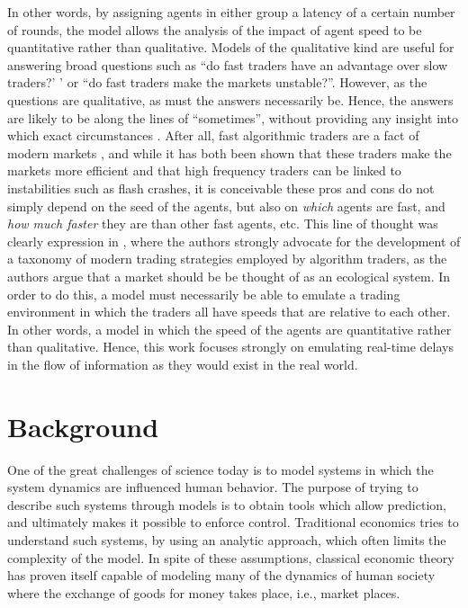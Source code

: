 \documentclass{article}
\begin{document}
%

In other words, by assigning agents in either group a latency of a certain number of rounds, the model allows the analysis of the impact of agent speed to be quantitative rather than qualitative. Models of the qualitative kind are useful for answering broad questions such as ``do fast traders have an advantage over slow traders?' ' or ``do fast traders make the markets unstable?''. However, as the questions are qualitative, as must the answers necessarily be. Hence, the answers are likely to be along the lines of ``sometimes'', without providing any insight into which exact circumstances . After all, fast algorithmic traders are a fact of modern markets , and while it has both been shown that these traders make the markets more efficient \cite{keylist} and that high frequency traders can be linked to instabilities such as flash crashes, it is conceivable these pros and cons do not simply depend on the seed of the agents, but also on \textit{which} agents are fast, and \textit{how much faster} they are than other fast agents, etc. This line of thought was clearly expression in \cite{farmer2013ecological}, where the authors strongly advocate for the development of a taxonomy of modern trading strategies employed by algorithm traders, as the authors argue that a market should be be thought of as an ecological system. In order to do this, a model must necessarily be able to emulate a trading environment in which the traders all have speeds that are relative to each other. In other words, a model in which the speed of the agents are quantitative rather than qualitative. Hence, this work focuses strongly on emulating real-time delays in the flow of information as they would exist in the real world.


\section{Background}
One of the great challenges of science today is to model systems in which the system dynamics are influenced  human behavior. The purpose of trying to describe such systems through models is to obtain tools which allow prediction, and ultimately makes it possible to enforce control. Traditional economics tries to understand such systems, by using an analytic approach, which often limits the complexity of the model. In spite of these assumptions, classical economic theory has proven itself capable of modeling many of the dynamics of human society where the exchange of goods for money takes place, i.e., market places.
\end{document}
